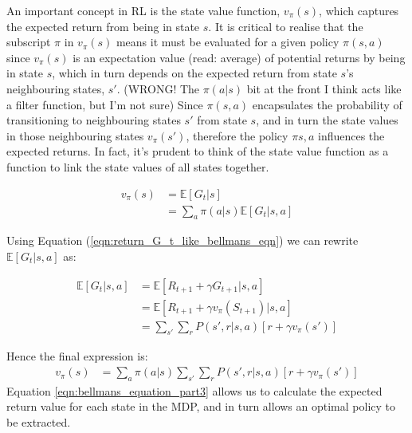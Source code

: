 \documentclass[a4paper,11pt]{article}
\begin{document}
An important concept in RL is the state value function, $v_{\pi}(s)$, which captures the expected return from being in state $s$.  It is critical to realise that the subscript $\pi$ in $v_{\pi}(s)$ means it must be evaluated for a given policy $\pi(s,a)$ since $v_{\pi}(s)$ is an expectation value (read: average) of potential returns by being in state $s$, which in turn depends on the expected return from state $s$'s neighbouring states, $s'$. (WRONG!  The $\pi(a|s)$ bit at the front I think acts like a filter function, but I'm not sure)  Since $\pi(s,a)$ encapsulates the probability of transitioning to neighbouring states $s'$ from state $s$, and in turn the state values in those neighbouring states $v_\pi(s')$, therefore the policy $\pi{s,a}$ influences the expected returns.  In fact, it's prudent to think of the state value function as a function to link the state values of all states together.

\begin{equation} \label{eqn:bellmans_equation_part1}
\begin{split}
        v_\pi (s) &= \mathbb{E}[G_t|s] \\
        &= \sum_{a} \pi(a|s) \mathbb{E} [G_t|s,a]
\end{split}
\end{equation}

Using Equation (\ref{eqn:return_G_t_like_bellmans_eqn}) we can rewrite $\mathbb{E} [G_t|s, a]$ as:

\begin{equation} \label{eqn:bellmans_equation_part2}
\begin{split}
        \mathbb{E} [G_t|s, a] &= \mathbb{E} [R_{t+1} + \gamma G_{t+1}|s, a] \\
        &= \mathbb{E} [R_{t+1} + \gamma v_\pi(S_{t+1})|s, a] \\
        &= \sum_{s'} \sum_r P(s',r|s,a) [r + \gamma v_{\pi}(s')]
\end{split}
\end{equation}

Hence the final expression is:
\begin{equation} \label{eqn:bellmans_equation_part3}
\begin{split}
        v_\pi (s) &= \sum_{a} \pi(a|s) \sum_{s'} \sum_r P(s',r|s,a) [r + \gamma v_{\pi}(s')]
\end{split}
\end{equation}
Equation \ref{eqn:bellmans_equation_part3} allows us to calculate the expected return value for each state in the MDP, and in turn allows an optimal policy to be extracted. 
\end{document}
